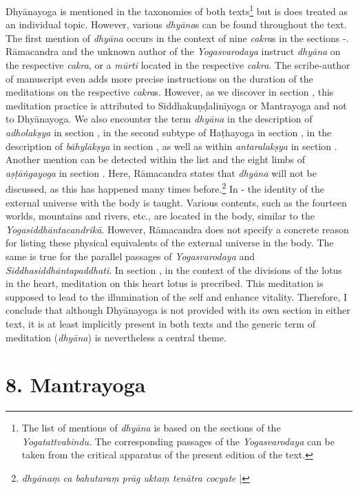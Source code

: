 Dhyānayoga is mentioned in the taxonomies of both texts\footnote{The list of mentions of \textit{dhyāna} is based on the sections of the \textit{Yogatattvabindu}. The corresponding passages of the \textit{Yogasvarodaya} can be taken from the critical apparatus of the present edition of the text.} but is does treated as an individual topic. However, various \textit{dhyāna}s can be found throughout the text. The first mention of \textit{dhyāna} occurs in the context of nine \textit{cakra}s in the sections -. Rāmacandra and the unknown author of the \textit{Yogasvarodaya} instruct \textit{dhyāna} on the respective \textit{cakra}, or a \textit{mūrti} located in the respective \textit{cakra}. The scribe-author of manuscript  even adds more precise instructions on the duration of the meditations on the respective \textit{cakra}s. However, as we discover in section , this meditation practice is attributed to Siddhakuṇḍalinīyoga or Mantrayoga and not to Dhyānayoga. We also encounter the term \textit{dhyāna} in the description of \textit{adholakṣya} in section , in the second subtype of Haṭhayoga in section , in the description of \textit{bāhylākṣya} in section , as well as within \textit{antaralakṣya} in section . Another mention can be detected within the list and the eight limbs of \textit{aṣṭāṅgayoga} in section . Here, Rāmacandra states that \textit{dhyāna} will not be discussed, as this has happened many times before.\footnote{\textit{dhyānaṃ ca bahutaraṃ prāg uktaṃ tenātra cocyate} |} In - the identity of the external universe with the body is taught. Various contents, such as the fourteen worlds, mountains and rivers, etc., are located in the body, similar to the \textit{Yogasiddhāntacandrikā}. However, Rāmacandra does not specify a concrete reason for listing these physical equivalents of the external universe in the body. The same is true for the parallel passages of \textit{Yogasvarodaya} and \textit{Siddhasiddhāntapaddhati}. In section , in the context of the divisions of the lotus in the heart, meditation on this heart lotus is precribed. This meditation is supposed to lead to the illumination of the self and enhance vitality. Therefore, I conclude that although Dhyānayoga is not provided with its own section in either text, it is at least implicitly present in both texts and the generic term of meditation (\textit{dhyāna}) is nevertheless a central theme. 

\section{8. Mantrayoga}
\label{dhyānayogaintro}


